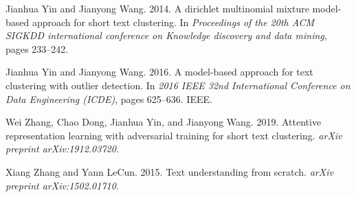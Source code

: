 \documentclass[11pt,a4paper]{article}
\begin{document}
\begin{thebibliography}{18}
Jianhua Yin and Jianyong Wang. 2014.
\newblock A dirichlet multinomial mixture model-based approach for short text
  clustering.
\newblock In \emph{Proceedings of the 20th ACM SIGKDD international conference
  on Knowledge discovery and data mining}, pages 233--242.

Jianhua Yin and Jianyong Wang. 2016.
\newblock A model-based approach for text clustering with outlier detection.
\newblock In \emph{2016 IEEE 32nd International Conference on Data Engineering
  (ICDE)}, pages 625--636. IEEE.

Wei Zhang, Chao Dong, Jianhua Yin, and Jianyong Wang. 2019.
\newblock Attentive representation learning with adversarial training for short
  text clustering.
\newblock \emph{arXiv preprint arXiv:1912.03720}.

Xiang Zhang and Yann LeCun. 2015.
\newblock Text understanding from scratch.
\newblock \emph{arXiv preprint arXiv:1502.01710}.

\end{thebibliography}
\end{document}
